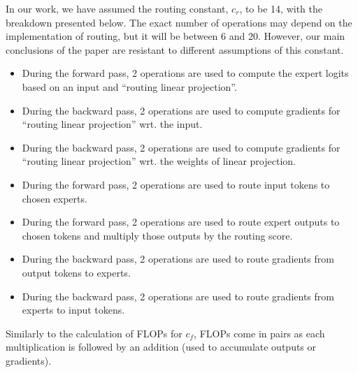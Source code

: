 \documentclass{article} %
\theoremstyle{plain}
\theoremstyle{definition}
\theoremstyle{remark}
\newcommand{\janek}[1]{\textcolor{teal}{\small [jl: #1]}}
\begin{document}
In our work, we have assumed the routing constant, $c_r$, to be 14, with the breakdown presented below. The exact number of operations may depend on the implementation of routing, but it will be between 6 and 20. However, our main conclusions of the paper are resistant to different assumptions of this constant.
\begin{itemize}
    \item During the forward pass, 2 operations are used to compute the expert logits based on an input and ``routing linear projection''.
    \item During the backward pass, 2 operations are used to compute gradients for ``routing linear projection'' wrt. the input.
    \item During the backward pass, 2 operations are used to compute gradients for ``routing linear projection'' wrt. the weights of linear projection.
    \item During the forward pass, 2 operations are used to route input tokens to chosen experts.
    \item During the forward pass, 2 operations are used to route expert outputs to chosen tokens and multiply those outputs by the routing score.
    \item During the backward pass, 2 operations are used to route gradients from output tokens to experts.
    \item During the backward pass, 2 operations are used to route gradients from experts to input tokens.
\end{itemize}

Similarly to the calculation of FLOPs for $c_f$, FLOPs come in pairs as each multiplication is followed by an addition (used to accumulate outputs or gradients).

\end{document}
